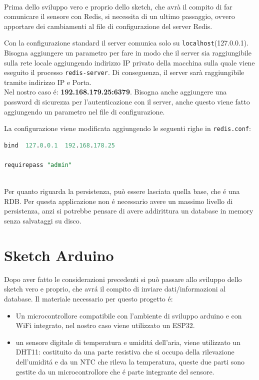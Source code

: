 \\

Prima dello sviluppo vero e proprio dello sketch, che avrà il compito di far comunicare il sensore con Redis,
si necessita di un ultimo passaggio, ovvero apportare dei cambiamenti al file di configurazione del server Redis.

Con la configurazione standard il server comunica solo su \texttt{localhost}(127.0.0.1).
Bisogna aggiungere un parametro per fare in modo che il server sia raggiungibile sulla rete locale aggiungendo indirizzo IP
privato della macchina sulla quale viene eseguito il processo \texttt{redis-server}.
Di conseguenza, il server sarà raggiungibile tramite indirizzo IP e Porta.\\
Nel nostro caso é: \textbf{192.168.179.25:6379}.
Bisogna anche aggiungere una password di sicurezza per l'autenticazione con il server, anche questo viene fatto
aggiungendo un parametro nel file di configurazione.

La configurazione viene modificata aggiungendo le seguenti righe in \texttt{redis.conf}:
\begin{lstlisting}[autogobble, style=redis-cli, language=SQL]
bind  127.0.0.1  192.168.178.25

requirepass "admin"\end{lstlisting}

\\

Per quanto riguarda la persistenza, può essere lasciata quella base, che é una RDB.
Per questa applicazione non é necessario avere un massimo livello di persistenza, anzi si potrebbe pensare
di avere addirittura un database in memory senza salvataggi su disco.

\section{Sketch Arduino}
Dopo aver fatto le considerazioni precedenti si può passare allo sviluppo dello sketch vero e proprio, che avrá il compito
di inviare dati/informazioni al database.
Il materiale necessario per questo progetto é:
\begin{itemize}
    \item Un microcontrollore compatibile con l'ambiente di sviluppo arduino e con WiFi integrato,
          nel nostro caso viene utilizzato un ESP32.
    \item un sensore digitale di temperatura e umiditá dell'aria, viene utilizzato un DHT11: costituito da una parte resistiva
    che si occupa della rilevazione dell'umiditá e da un NTC che rileva la temperatura, queste due parti sono gestite
    da un microcontrollore che é parte integrante del sensore.
\end{itemize}

